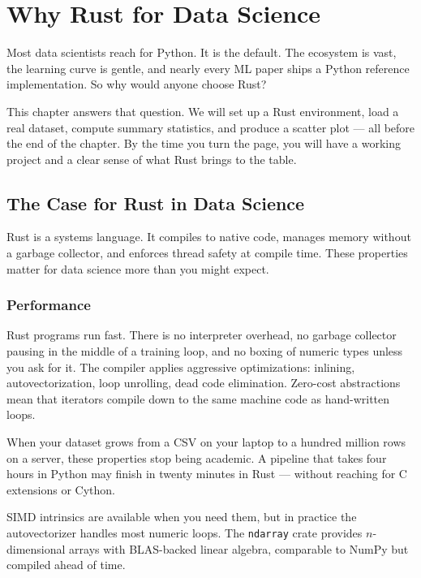 \chapter{Why Rust for Data Science}
\label{ch:why-rust}

Most data scientists reach for Python. It is the default. The ecosystem is vast,
the learning curve is gentle, and nearly every ML paper ships a Python reference
implementation. So why would anyone choose Rust?

This chapter answers that question. We will set up a Rust environment, load a
real dataset, compute summary statistics, and produce a scatter plot --- all
before the end of the chapter. By the time you turn the page, you will have a
working project and a clear sense of what Rust brings to the table.


\section{The Case for Rust in Data Science}
\label{sec:case-for-rust}

Rust is a systems language. It compiles to native code, manages memory without a
garbage collector, and enforces thread safety at compile time. These properties
matter for data science more than you might expect.

\subsection{Performance}

Rust programs run fast. There is no interpreter overhead, no garbage collector
pausing in the middle of a training loop, and no boxing of numeric types unless
you ask for it. The compiler applies aggressive optimizations: inlining,
autovectorization, loop unrolling, dead code elimination. Zero-cost abstractions
mean that iterators compile down to the same machine code as hand-written loops.

When your dataset grows from a CSV on your laptop to a hundred million rows on a
server, these properties stop being academic. A pipeline that takes four hours in
Python may finish in twenty minutes in Rust --- without reaching for C extensions
or Cython.

SIMD intrinsics are available when you need them, but in practice the
autovectorizer handles most numeric loops. The \texttt{ndarray} crate provides
$n$-dimensional arrays with BLAS-backed linear algebra, comparable to NumPy but
compiled ahead of time.

